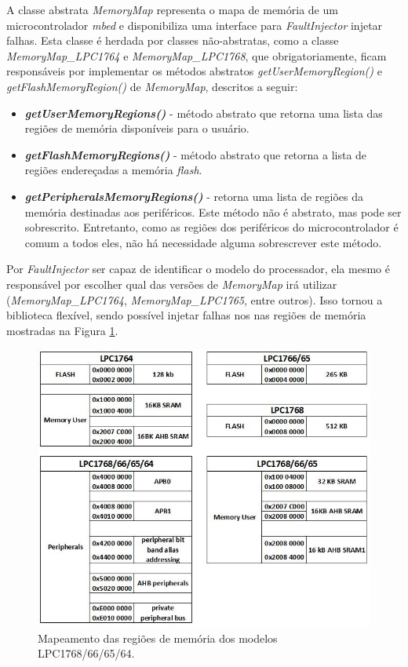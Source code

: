 A classe abstrata \textit{MemoryMap} representa o mapa de memória de um microcontrolador \textit{mbed} e disponibiliza uma interface para \textit{FaultInjector} injetar falhas. Esta classe é herdada por classes não-abstratas, como a classe \textit{MemoryMap\_LPC1764} e \textit{MemoryMap\_LPC1768}, que obrigatoriamente, ficam responsáveis por implementar os métodos abstratos \textit{getUserMemoryRegion()} e \textit{getFlashMemoryRegion()} de \textit{MemoryMap}, descritos a seguir:

\begin{itemize}
	\item \textbf{\textit{getUserMemoryRegions()}} - método abstrato que retorna uma lista das regiões de memória disponíveis para o usuário.				
	
	\item \textbf{\textit{getFlashMemoryRegions()}} - método abstrato que retorna a lista de regiões endereçadas a memória \textit{flash}.
	
	\item \textbf{\textit{getPeripheralsMemoryRegions()}} - retorna uma lista de regiões da memória destinadas aos periféricos. Este método não é abstrato, mas pode ser sobrescrito. Entretanto, como as regiões dos periféricos do microcontrolador é comum a todos eles, não há necessidade alguma sobrescrever este método.
\end{itemize}

Por \textit{FaultInjector} ser capaz de identificar o modelo do processador, ela mesmo é responsável por escolher qual das versões de \textit{MemoryMap} irá utilizar (\textit{MemoryMap\_LPC1764}, \textit{MemoryMap\_LPC1765}, entre outros). Isso tornou a biblioteca flexível, sendo possível injetar falhas nos nas regiões de memória mostradas na Figura \ref{Img:memoryMap}.

\begin{figure}[H]
	\centering
	\includegraphics[width=1.0\textwidth]{figuras/memoryMap.jpg}
	\caption[Mapas das Regiões de Memória dos Modelos LPC1768/66/65/64]{Mapeamento das regiões de memória dos modelos LPC1768/66/65/64.}
	\label{Img:memoryMap}	
\end{figure}


